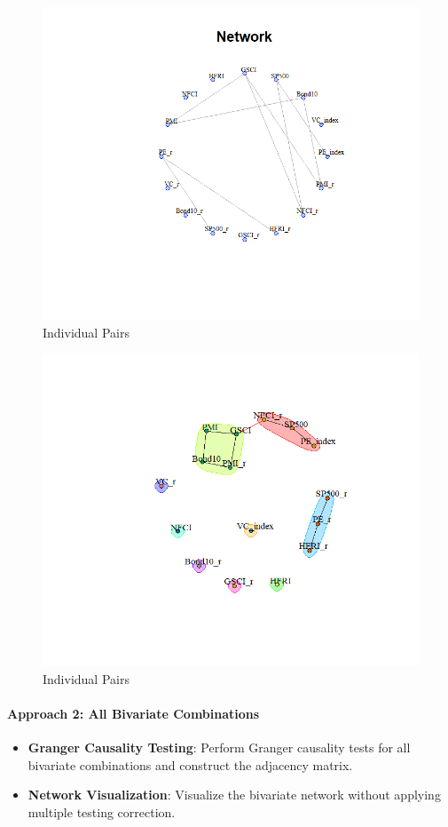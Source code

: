 \documentclass[12pt]{article}
\begin{document}
\begin{figure}[H]
    \centering
    \includegraphics[width=1\linewidth]{Rplot20.png}
    \caption{Individual Pairs}
    \label{fig:enter-label}
\end{figure}
\begin{figure}[H]
    \centering
    \includegraphics[width=1\linewidth]{Rplot21.png}
    \caption{Individual Pairs}
    \label{fig:enter-label}
\end{figure}
\paragraph{Approach 2: All Bivariate Combinations}
\begin{itemize}

    \item \textbf{Granger Causality Testing}: Perform Granger causality tests for all bivariate combinations and construct the adjacency matrix.
    \item \textbf{Network Visualization}: Visualize the bivariate network without applying multiple testing correction.
\end{itemize}
\end{document}
